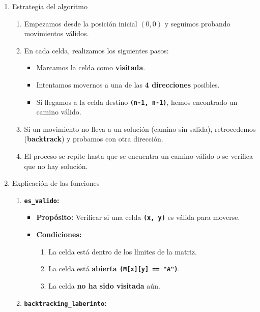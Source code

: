 \begin{enumerate}[label=\color{red}\textbf{\arabic*)}]
\begin{enumerate}[label=\arabic*)]
    
  \item Estrategia del algoritmo
    \begin{enumerate}[label=\arabic*)]
      \item Empezamos desde la posición inicial $(0,0)$ y seguimos probando movimientos válidos.
      \item En cada celda, realizamos los siguientes pasos:
         \begin{itemize}[label=\textbullet]
          \item Marcamos la celda como \textbf{visitada}.
          \item Intentamos movernos a una de las \textbf{4 direcciones} posibles.
          \item Si llegamos a la celda destino \textbf{\texttt{(n-1, n-1)}}, hemos encontrado un camino válido.
        \end{itemize}
      \item Si un movimiento no lleva a un solución (camino sin salida), retrocedemos (\textbf{backtrack}) y probamos con otra dirección.
      \item El proceso se repite hasta que se encuentra un camino válido o se verifica que no hay solución.
    \end{enumerate}
  \item Explicación de las funciones
    \begin{enumerate}[label=\arabic*)]
      \item \textbf{\texttt{es\_valido}:}
        
        \begin{itemize}[label=\textbullet]
          \item \textbf{Propósito:} Verificar si una celda \textbf{\texttt{(x, y)}}  es válida para moverse.
          \item \textbf{Condiciones:}
            \begin{enumerate}[label=\arabic*)]
              \item La celda está dentro de los límites de la matriz.
              \item La celda está \textbf{abierta \texttt{(M[x][y] == "A")}}.
              \item La celda \textbf{no ha sido visitada} aún. 
            \end{enumerate}
        \end{itemize}
      \item \textbf{\texttt{backtracking\_laberinto}:}
        

\end{enumerate}
\end{enumerate}
\end{enumerate}
